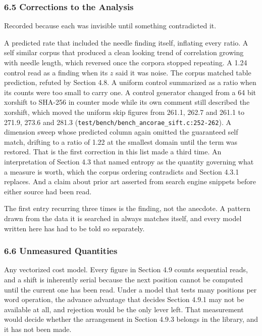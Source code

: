\subsubsection{6.5 Corrections to the Analysis}

Recorded because each was invisible until something contradicted it.

A predicted rate that included the needle finding itself, inflating every ratio. A self similar corpus that produced a clean looking trend of correlation growing with needle length, which reversed once the corpora stopped repeating. A 1.24 control read as a finding when its \(z\) said it was noise. The corpus matched table prediction, refuted by Section 4.8. A uniform control summarized as a ratio when its counts were too small to carry one. A control generator changed from a 64 bit xorshift to SHA-256 in counter mode while its own comment still described the xorshift, which moved the uniform skip figures from 261.1, 262.7 and 261.1 to 271.9, 273.6 and 281.3 (\texttt{test/\allowbreak{}bench/\allowbreak{}bench\_\allowbreak{}ancorae\_\allowbreak{}sift.\allowbreak{}c:252-\allowbreak{}262}). A dimension sweep whose predicted column again omitted the guaranteed self match, drifting to a ratio of 1.22 at the smallest domain until the term was restored. That is the first correction in this list made a third time. An interpretation of Section 4.3 that named entropy as the quantity governing what a measure is worth, which the corpus ordering contradicts and Section 4.3.1 replaces. And a claim about prior art asserted from search engine snippets before either source had been read.

The first entry recurring three times is the finding, not the anecdote. A pattern drawn from the data it is searched in always matches itself, and every model written here has had to be told so separately.

\subsubsection{6.6 Unmeasured Quantities}

Any vectorized cost model. Every figure in Section 4.9 counts sequential reads, and a shift is inherently serial because the next position cannot be computed until the current one has been read. Under a model that tests many positions per word operation, the advance advantage that decides Section 4.9.1 may not be available at all, and rejection would be the only lever left. That measurement would decide whether the arrangement in Section 4.9.3 belongs in the library, and it has not been made.

